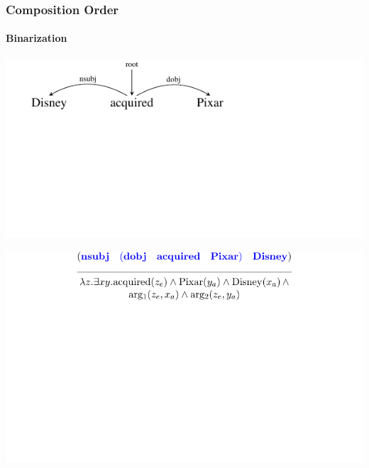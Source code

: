 \documentclass[mathserif,12pt]{beamer}
\begin{document}
\begin{frame}
\frametitle{Composition Order}
\framesubtitle{Binarization}
\begin{center}
\vspace{1em}
\includegraphics[trim=2em 9.4em 10em 0em,clip=true,scale=1.3]{figures/pixar}

\vspace{4cm}

\includegraphics[trim=7em 10em 7em 2.5em,clip=true,scale=1.1]{figures/dependency-transitive-derivation_full}
\vspace{-2cm}
\end{center}
\end{frame}
\end{document}
